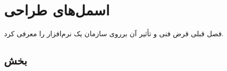 \chapter{اسمل‌های طراحی}\label{ch:2}

فصل قبلی قرض فنی و تأثیر آن برروی سازمان یک نرم‌افزار را معرفی کرد.


\section{بخش}


